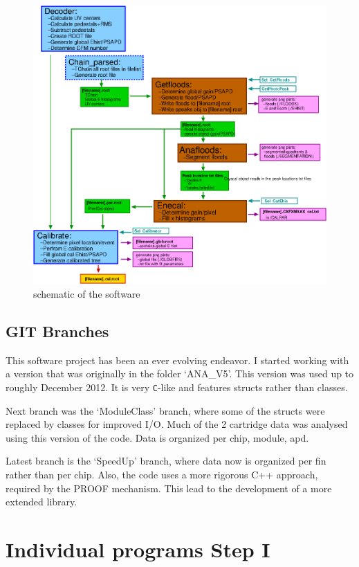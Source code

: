 \documentclass[12pt]{article}
\begin{document}
\begin{figure}
\includegraphics[angle=90,width=.8\textheight]{./SW_Scheme.png}
\caption{schematic of the software}
\label{fig:singlescal}
\end{figure}

\subsection{GIT Branches}
This software project has been an ever evolving endeavor. I started working with a version that was originally in the folder `ANA\_V5'. This version was used up to roughly December 2012. It is very {\tt C}-like and features structs rather than classes. 

Next branch was the `ModuleClass' branch, where some of the structs were replaced by classes for improved I/O. Much of the 2 cartridge data was analysed using this version of the code. Data is organized per chip, module, apd.

Latest branch is the `SpeedUp' branch, where data now is organized per fin rather than per chip. Also, the code uses a more rigorous C++ approach, required by the PROOF mechanism. This lead to the development of a more extended library.

\section{Individual programs Step I}
\end{document}
